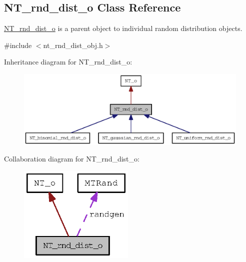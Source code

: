 \subsection{NT\_\-rnd\_\-dist\_\-o Class Reference}
\label{class_n_t__rnd__dist__o}


\hyperlink{class_n_t__rnd__dist__o}{NT\_\-rnd\_\-dist\_\-o} is a parent object to individual random distribution objects.  




{\ttfamily \#include $<$nt\_\-rnd\_\-dist\_\-obj.h$>$}



Inheritance diagram for NT\_\-rnd\_\-dist\_\-o:
\nopagebreak
\begin{figure}[H]
\begin{center}
\leavevmode
\includegraphics[width=400pt]{class_n_t__rnd__dist__o__inherit__graph}
\end{center}
\end{figure}


Collaboration diagram for NT\_\-rnd\_\-dist\_\-o:
\nopagebreak
\begin{figure}[H]
\begin{center}
\leavevmode
\includegraphics[width=156pt]{class_n_t__rnd__dist__o__coll__graph}
\end{center}
\end{figure}
